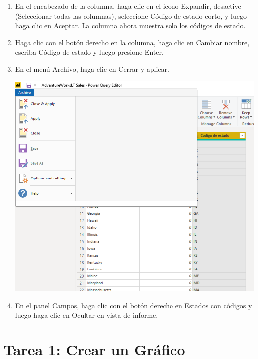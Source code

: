 \documentclass[12pt,letterpaper]{article}
\begin{document}
\begin{enumerate}
    \item En el encabezado de la columna, haga clic en el icono Expandir, desactive (Seleccionar todas las columnas), seleccione Código de estado corto, y luego haga clic en Aceptar. La columna ahora muestra solo los códigos de estado.
    
     
    \item Haga clic con el botón derecho en la columna, haga clic en Cambiar nombre, escriba Código de estado y luego presione Enter.
    
    \item En el menú Archivo, haga clic en Cerrar y aplicar.
    
        \begin{center}
	\includegraphics[width=13cm]{./Imagenes/11}
	\end{center}
    
    \item En el panel Campos, haga clic con el botón derecho en Estados con códigos y luego haga clic en Ocultar en vista de informe.
 

    

\end{enumerate}

\section{Tarea 1: Crear un Gráfico}
\end{document}
